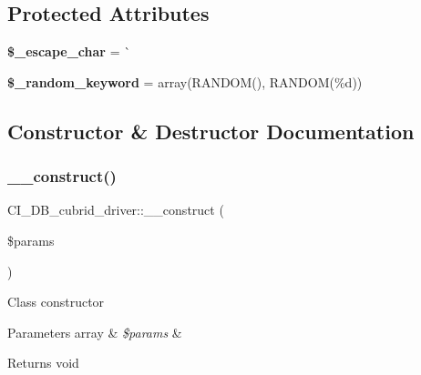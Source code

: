 \subsection*{Protected Attributes}
\begin{DoxyCompactItemize}
\item 
\mbox{\label{class_c_i___d_b__cubrid__driver_af3443182569426558c667c44a6469701}} 
{\bfseries \$\+\_\+escape\+\_\+char} = \textquotesingle{}\`{}\textquotesingle{}
\item 
\mbox{\label{class_c_i___d_b__cubrid__driver_aa942491ff454f235c9db6637068364ff}} 
{\bfseries \$\+\_\+random\+\_\+keyword} = array(\textquotesingle{}R\+A\+N\+D\+OM()\textquotesingle{}, \textquotesingle{}R\+A\+N\+D\+OM(\%d)\textquotesingle{})
\end{DoxyCompactItemize}


\subsection{Constructor \& Destructor Documentation}
\mbox{\label{class_c_i___d_b__cubrid__driver_ad83d25f800ca3549052940b456824840}} 
\subsubsection{\texorpdfstring{\+\_\+\+\_\+construct()}{\_\_construct()}}
{\footnotesize\ttfamily C\+I\+\_\+\+D\+B\+\_\+cubrid\+\_\+driver\+::\+\_\+\+\_\+construct (\begin{DoxyParamCaption}\item[{}]{\$params }\end{DoxyParamCaption})}

Class constructor


\begin{DoxyParams}[1]{Parameters}
array & {\em \$params} & \\
\hline
\end{DoxyParams}
\begin{DoxyReturn}{Returns}
void 
\end{DoxyReturn}


